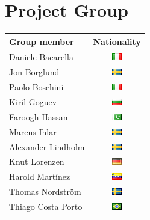 \section{Project Group}

\begin{table}
\centering
\begin{tabular}{|l|c|}
\hline
Group member & Nationality \\ \hline\hline
Daniele Bacarella & \includegraphics{graphics/it.png} \\
Jon Borglund & \includegraphics{graphics/se.png} \\
Paolo Boschini & \includegraphics{graphics/it.png} \\
Kiril Goguev & \includegraphics{graphics/bg.png} \\
Faroogh Hassan & \includegraphics{graphics/pk.png} \\
Marcus Ihlar & \includegraphics{graphics/se.png} \\
Alexander Lindholm & \includegraphics{graphics/se.png} \\
Knut Lorenzen & \includegraphics{graphics/de.png} \\
Harold Mart\'{i}nez & \includegraphics{graphics/ve.png} \\
Thomas Nordstr\"om & \includegraphics{graphics/se.png} \\
Thiago Costa Porto & \includegraphics{graphics/br.png} \\

\end{tabular}
\end{table}
